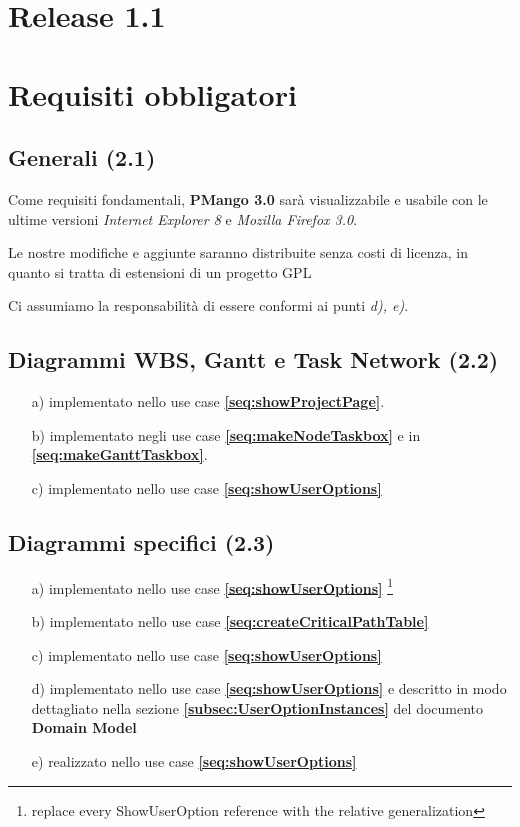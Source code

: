\chapter*{Release \textbf{1.1}}

\chapter{Requisiti obbligatori}

\section{Generali (2.1)}
Come requisiti fondamentali, \textbf{PMango 3.0} sar\`a visualizzabile e
usabile con le ultime versioni \emph{Internet Explorer 8} e \emph{Mozilla
Firefox 3.0}.

Le nostre modifiche e aggiunte saranno distribuite senza costi di licenza, in
quanto si tratta di estensioni di un progetto GPL

Ci assumiamo la responsabilit\`a di essere conformi ai punti \emph{d), e)}.

\section{Diagrammi WBS, Gantt e Task Network (2.2)}
\begin{itemize}
  \item[a)] implementato nello use case \textbf{\ref{seq:showProjectPage}}.
  \item[b)] implementato negli use case \textbf{\ref{seq:makeNodeTaskbox}} e in
  \textbf{\ref{seq:makeGanttTaskbox}}.
  \item[c)] implementato nello use case \textbf{\ref{seq:showUserOptions}}
\end{itemize}

\section{Diagrammi specifici (2.3)}
\begin{itemize}
  \item[a)] implementato nello use case \textbf{\ref{seq:showUserOptions}}
  \footnote{replace every ShowUserOption reference with the relative
  generalization}
  \item[b)] implementato nello use case
  \textbf{\ref{seq:createCriticalPathTable}}
  \item[c)] implementato nello use case \textbf{\ref{seq:showUserOptions}}
  \item[d)] implementato nello use case \textbf{\ref{seq:showUserOptions}} e
  descritto in modo dettagliato nella sezione
  \textbf{\ref{subsec:UserOptionInstances}} del documento
  \textbf{Domain Model}
  \item[e)] realizzato nello use case \textbf{\ref{seq:showUserOptions}}
\end{itemize}

